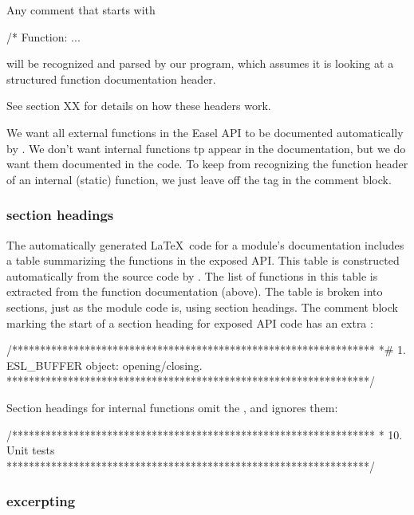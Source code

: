 Any comment that starts with
\begin{cchunk}
/* Function:  ...
\end{cchunk}
will be recognized and parsed by our  program, 
which assumes it is looking at a structured function documentation
header.

See section XX for details on how these headers work.

We want all external functions in the Easel API to be documented
automatically by . We don't want internal functions tp
appear in the documentation, but we do want them documented in the
code.  To keep  from recognizing the function header of
an internal (static) function, we just leave off the 
tag in the comment block.   

\subsubsection{section headings}

The automatically generated \LaTeX\ code for a module's documentation
includes a table summarizing the functions in the exposed API. This
table is constructed automatically from the source code by
. The list of functions in this table is extracted
from the function documentation (above). The table is broken into
sections, just as the module code is, using section headings. The
comment block marking the start of a section heading for exposed API
code has an extra \ccode{\#}:

\begin{cchunk}
/*****************************************************************
 *# 1. ESL_BUFFER object: opening/closing.
 *****************************************************************/
\end{cchunk}

Section headings for internal functions omit the \ccode{\#}, and
 ignores them:

\begin{cchunk}
/*****************************************************************
 * 10. Unit tests
 *****************************************************************/
\end{cchunk}

\subsubsection{excerpting}

